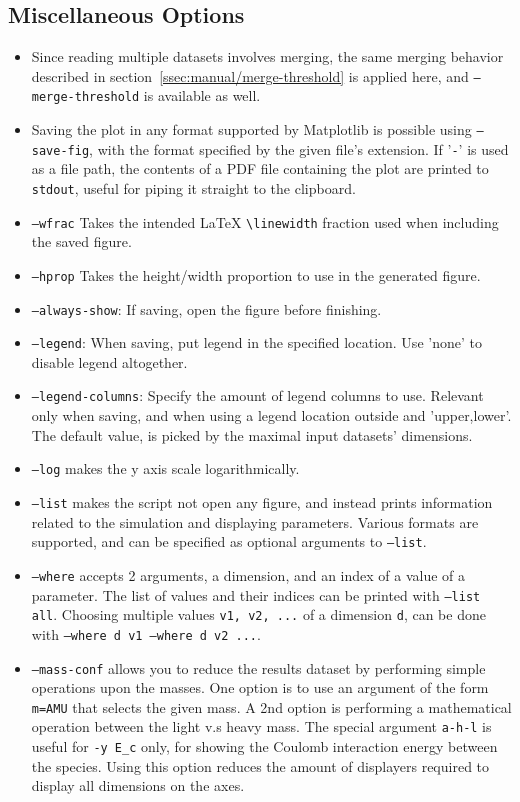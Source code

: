 \subsection{Miscellaneous Options}\label{ssec:manual/misc-options}

\begin{itemize}
	\item Since reading multiple datasets involves merging, the same merging behavior described in section~\ref{ssec:manual/merge-threshold} is applied here, and \texttt{--merge-threshold} is available as well.
	\item Saving the plot in any format supported by Matplotlib is possible using \texttt{--save-fig}, with the format specified by the given file's extension. If '\texttt{-}' is used as a file path, the contents of a PDF file containing the plot are printed to \texttt{stdout}, useful for piping it straight to the clipboard.
  	\item \texttt{--wfrac} Takes the intended LaTeX \texttt{\textbackslash linewidth} fraction used when including the saved figure.
	\item \texttt{--hprop} Takes the height/width proportion to use in the generated figure.
	\item \texttt{--always-show}: If saving, open the figure before finishing.
	\item \texttt{--legend}: When saving, put legend in the specified location. Use 'none' to disable legend altogether.
	\item \texttt{--legend-columns}: Specify the amount of legend columns to use. Relevant only when saving, and when using a legend location outside and '{upper,lower}'. The default value, is picked by the maximal input datasets' dimensions.
	\item \texttt{--log} makes the y axis scale logarithmically. 
	\item \texttt{--list} makes the script not open any figure, and instead prints information related to the simulation and displaying parameters. Various formats are supported, and can be specified as optional arguments to \texttt{--list}.
	\item \texttt{--where} accepts 2 arguments, a dimension, and an index of a value of a parameter. The list of values and their indices can be printed with \texttt{--list all}. Choosing multiple values \texttt{v1, v2, ...} of a dimension \texttt{d}, can be done with \texttt{--where d v1 --where d v2 ...}.
	\item \texttt{--mass-conf} allows you to reduce the results dataset by performing simple operations upon the masses. One option is to use an argument of the form \texttt{m=AMU} that selects the given mass. A 2nd option is performing a mathematical operation between the light v.s heavy mass. The special argument \texttt{a-h-l} is useful for \texttt{-y E\_c} only, for showing the Coulomb interaction energy between the species. Using this option reduces the amount of displayers required to display all dimensions on the axes.

\end{itemize}
